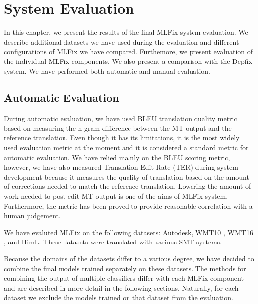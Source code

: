 \chapter{System Evaluation}
\label{chap:eval}

In this chapter, we present the results of the final MLFix system evaluation.
We describe additional datasets we have used during the evaluation and different
configurations of MLFix we have compared. Furthemore, we present evaluation
of the individual MLFix components.
We also present a comparison with the Depfix
system. We have performed both automatic and manual evaluation.

\section{Automatic Evaluation}

During automatic evaluation, we have used BLEU \citep{papineni:2002} translation
quality metric based on measuring the n-gram difference between the MT output
and the reference translation.
Even though it has its limitations, it is the most widely used
evaluation metric at the moment and it is considered a standard metric for automatic evaluation.
We have relied mainly on the BLEU scoring metric, however, we have 
also measured Translation Edit Rate (TER) \citep{Snover06astudy} during system development because it measures
the quality of translation based on the amount of corrections needed to match
the reference translation. Lowering the amount of work needed to post-edit MT output
is one of the aims of MLFix system. Furthermore, the metric has been proved to provide
reasonable correlation with a human judgement.

We have evaluted MLFix on the following datasets: Autodesk, WMT10\linebreak
\citep{callisonburch-EtAl:2010:WMT}, WMT16 \citep{bojar-EtAl:2016:WMT1}, and HimL.
These datasets
were translated with various SMT systems.

Because the domains of the datasets differ to a various degree,
we have decided to combine the final models trained separately
on these datasets. The methods for combining the output of multiple classifiers
differ with each MLFix component and are described in more detail in the following
sections.
Naturally, for each dataset we exclude the models trained on that dataset from
the evaluation.


